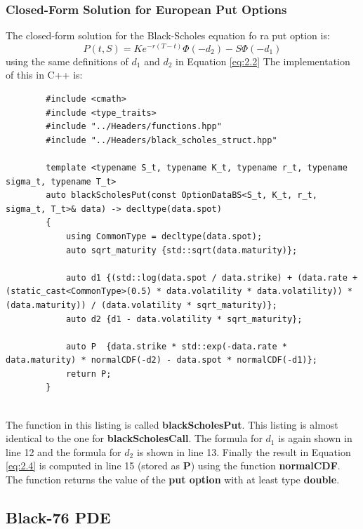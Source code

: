 \documentclass[12pt]{article}
\numberwithin{equation}{section}
\begin{document}
\subsubsection{Closed-Form Solution for European Put Options}
 The closed-form solution for the Black-Scholes equation fo ra put option is: 
\begin{equation}
	P(t,S) = Ke^{-r(T-t)}\Phi(-d_2) - S\Phi(-d_1)
	\label{eq:2.4} 
\end{equation}
using the same definitions of $d_1$ and $d_2$ in Equation \ref{eq:2.2} \cite{haugh2016BlackScholes} \newline \newline 
The implementation of this in C++ is:
\begin{listing}[ht]
	\begin{verbatim}
		#include <cmath>
		#include <type_traits>
		#include "../Headers/functions.hpp"
		#include "../Headers/black_scholes_struct.hpp"
		
		template <typename S_t, typename K_t, typename r_t, typename sigma_t, typename T_t>
		auto blackScholesPut(const OptionDataBS<S_t, K_t, r_t, sigma_t, T_t>& data) -> decltype(data.spot)
		{
			using CommonType = decltype(data.spot);
			auto sqrt_maturity {std::sqrt(data.maturity)};
			
			auto d1 {(std::log(data.spot / data.strike) + (data.rate + (static_cast<CommonType>(0.5) * data.volatility * data.volatility)) * (data.maturity)) / (data.volatility * sqrt_maturity)};
			auto d2 {d1 - data.volatility * sqrt_maturity};
			
			auto P  {data.strike * std::exp(-data.rate * data.maturity) * normalCDF(-d2) - data.spot * normalCDF(-d1)};
			return P;
		}
		
	\end{verbatim}
	\caption{Black Scholes Put using Closed Form Solution}
	\label{blackscholesCFput}
\end{listing}


 The function in this listing is called \textbf{blackScholesPut}. This listing is almost identical to the one for \textbf{blackScholesCall}. The formula for $d_1$ is again shown in line 12 and the formula for $d_2$ is shown in line 13.  Finally the result in Equation \ref{eq:2.4} is computed in line 15 (stored as \textbf{P}) using the function \textbf{normalCDF}. The function returns the value of the \textbf{put option} with at least type \textbf{double}. 
\newpage
\subsection{Black-76 PDE}
\end{document}
